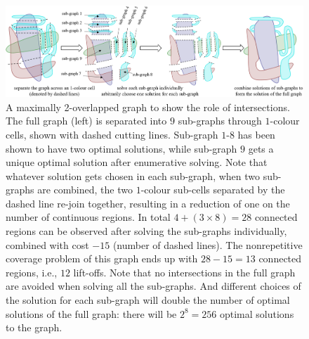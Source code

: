 \documentclass[journal]{IEEEtran}
\begin{document}
\begin{figure}[t]
\centering
\includegraphics[width=\textwidth]{figures/two_overlapped_graph_2}
\caption{A maximally 2-overlapped graph to show the role of intersections. The full graph (left) is separated into $9$ sub-graphs through $1$-colour cells, shown with dashed cutting lines. Sub-graph $1$-$8$ has been shown to have two optimal solutions, while sub-graph $9$ gets a unique optimal solution after enumerative solving. Note that whatever solution gets chosen in each sub-graph, when two sub-graphs are combined, the two $1$-colour sub-cells separated by the dashed line re-join together, resulting in a reduction of one on the number of continuous regions. In total $4+(3\times 8)=28$ connected regions can be observed after solving the sub-graphs individually, combined with cost $-15$ (number of dashed lines). The nonrepetitive coverage problem of this graph ends up with $28-15=13$ connected regions, i.e., $12$ lift-offs. 
Note that no intersections in the full graph are avoided when solving all the sub-graphs. And different choices of the solution for each sub-graph will double the number of optimal solutions of the full graph: there will be $2^8=256$ optimal solutions to the graph.
}
\label{fig:two_overlapped_graph}
\end{figure}
\end{document}
